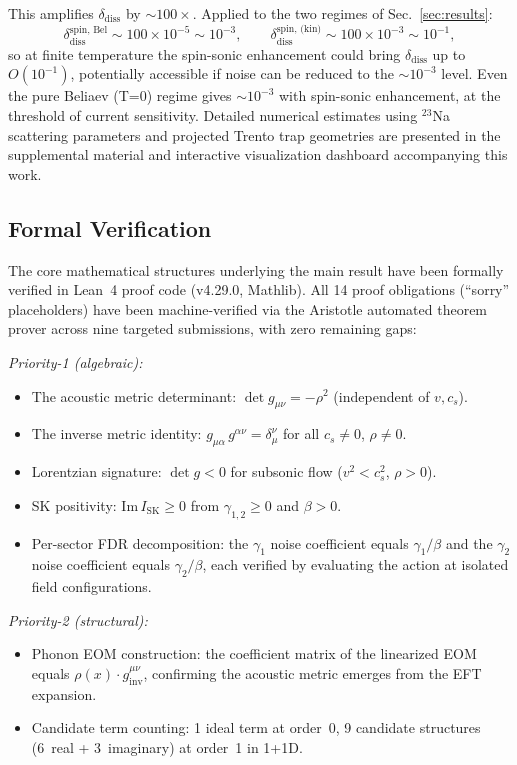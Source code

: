 \documentclass[aps,prl,twocolumn,superscriptaddress,nofootinbib,amsmath,amssymb]{revtex4-2}
\begin{document}
This amplifies $\delta_{\text{diss}}$ by $\sim 100\times$. Applied to the two
regimes of Sec.~\ref{sec:results}:
\begin{equation}
\delta_{\text{diss}}^{\text{spin, Bel}} \sim 100 \times 10^{-5} \sim 10^{-3},
\qquad
\delta_{\text{diss}}^{\text{spin, (kin)}} \sim 100 \times 10^{-3} \sim 10^{-1},
\end{equation}
so at finite temperature the spin-sonic enhancement could bring
$\delta_{\text{diss}}$ up to $O(10^{-1})$, potentially accessible if noise can
be reduced to the $\sim 10^{-3}$ level. Even the pure Beliaev (T=0) regime
gives $\sim 10^{-3}$ with spin-sonic enhancement, at the threshold of current
sensitivity. Detailed numerical estimates using $^{23}$Na scattering parameters
and projected Trento trap geometries are presented in the supplemental material
and interactive visualization dashboard accompanying this work.

\subsection{Formal Verification}

The core mathematical structures underlying the main result have been formally verified in Lean~4 proof code (v4.29.0, Mathlib). All 14 proof obligations (``sorry'' placeholders) have been machine-verified via the Aristotle automated theorem prover across nine targeted submissions, with zero remaining gaps:

\textit{Priority-1 (algebraic):}
\begin{itemize}
\item The acoustic metric determinant: $\det g_{\mu\nu} = -\rho^2$ (independent of $v, c_s$).
\item The inverse metric identity: $g_{\mu\alpha}\, g^{\alpha\nu} = \delta^\nu_\mu$ for all $c_s \neq 0$, $\rho \neq 0$.
\item Lorentzian signature: $\det g < 0$ for subsonic flow ($v^2 < c_s^2$, $\rho > 0$).
\item SK positivity: $\mathrm{Im}\, I_{\text{SK}} \geq 0$ from $\gamma_{1,2} \geq 0$ and $\beta > 0$.
\item Per-sector FDR decomposition: the $\gamma_1$ noise coefficient equals $\gamma_1/\beta$ and the $\gamma_2$ noise coefficient equals $\gamma_2/\beta$, each verified by evaluating the action at isolated field configurations.
\end{itemize}

\textit{Priority-2 (structural):}
\begin{itemize}
\item Phonon EOM construction: the coefficient matrix of the linearized EOM equals $\rho(x) \cdot g^{\mu\nu}_{\text{inv}}$, confirming the acoustic metric emerges from the EFT expansion.
\item Candidate term counting: 1 ideal term at order~0, 9 candidate structures (6~real + 3~imaginary) at order~1 in 1+1D.
\end{itemize}
\end{document}
